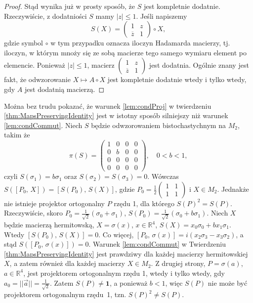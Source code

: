 \begin{proof}
Stąd wynika już w prosty sposób, że $S$ jest kompletnie dodatnie.
Rzeczywiście,
z dodatniości $S$ mamy $|z| \leq 1$.
Jeśli napiszemy
\begin{equation}
S(X) =
\begin{pmatrix}
1 & z \\ \overline{z} & 1
\end{pmatrix} \circ X,
\end{equation}
gdzie symbol $\circ$ w tym przypadku oznacza iloczyn Hadamarda macierzy,
tj. iloczyn, w którym mnoży się ze sobą macierze tego samego wymiaru
element po elemencie.
Ponieważ $|z| \leq 1$, macierz
$
\left(
\begin{smallmatrix} 1 & z \\ \overline{z} & 1 \end{smallmatrix}
\right)$
jest dodatnia.
Ogólnie znany jest fakt, że odwzorowanie $X \mapsto A \circ X$
jest kompletnie dodatnie wtedy i tylko wtedy, gdy $A$
jest dodatnią macierzą.
\end{proof}

\begin{Example}
Można bez trudu pokazać, że warunek \ref{lem:condProj} w
twierdzeniu \ref{thm:MapsPreservingIdentity} jest w istotny sposób silniejszy
niż warunek \ref{lem:condCommut}.
Niech $S$ będzie odwzorowaniem bistochastychnym na $M_{2}$, takim że
\begin{equation}
\label{RandomLabel:514431}
    \pi(S) = \begin{pmatrix}
    1 & 0 & 0 & 0 \\
    0 & b & 0 & 0 \\
    0 & 0 & 0 & 0 \\
    0 & 0 & 0 & 0
    \end{pmatrix},
    \quad 0 < b < 1,
\end{equation}
czyli $S(\sigma_{1}) = b \sigma_{1}$ oraz
$S(\sigma_{2}) = S(\sigma_{3}) = 0$.
Wówczas $S\left( [P_{0}, \, X ] \right) = [ S(P_{0}), \, S(X) ]$,
gdzie
$P_{0}= \frac{1}{2} \left( \begin{smallmatrix}
 1 & 1 \\ 1 & 1
 \end{smallmatrix} \right)$ i $X \in M_{2}$.
Jednakże nie istnieje projektor ortogonalny $P$ rzędu 1,
dla którego $S(P)^{2} = S(P)$.
Rzeczywiście, skoro
$P_{0} = \frac{1}{\sqrt{2}}(\sigma_{0} + \sigma_{1})$,
$S(P_{0}) = \frac{1}{\sqrt{2}}(\sigma_{0} + b \sigma_{1})$.
Niech $X$ będzie macierzą hermitowską, $X = \sigma(x)$, $x \in \mathbb{R}^{4}$,
$S(X) = x_{0} \sigma_{0} + b x_{1} \sigma_{1}$.
Wtedy $[S(P_{0}), \, S(X) ] =0$.
Co więcej,
$[P_{0}, \, \sigma(x)] =
i(x_{2} \sigma_{3} - x_{3} \sigma_{2})$,
a stąd
$S([P_{0}, \, \sigma(x)]) = 0$.
Warunek \ref{lem:condCommut} w Twierdzeniu \ref{thm:MapsPreservingIdentity}
jest prawdziwy dla każdej macierzy hermitowskiej $X$,
a zatem również dla każdej macierzy $X \in M_{2}$.
Z drugiej strony,
$P = \sigma(a)$, $a \in \mathbb{R}^{4}$, jest projektorem ortogonalnym
rzędu 1,
wtedy i tylko wtedy, gdy $a_{0} = ||\vec{a}|| = \frac{1}{\sqrt{2}}$.
Zatem $S(P) \neq \mathbf{1}$, a ponieważ $b<1$,
więc $S(P)$ nie może być projektorem ortogonalnym \mbox{rzędu 1},
tzn. $S(P)^{2} \neq S(P)$.
\end{Example}


